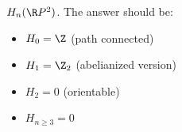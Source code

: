         \begin{remark}[Exam]
            $H_n(\R P^2)$. The answer should be:
            \begin{itemize}
                \item $H_0 = \Z$ (path connected)
                \item $H_1 = \Z_2$ (abelianized version)
                \item $H_2 = 0$ (orientable)
                \item $H_{n\ge 3} = 0$ 
            \end{itemize}
        \end{remark}
